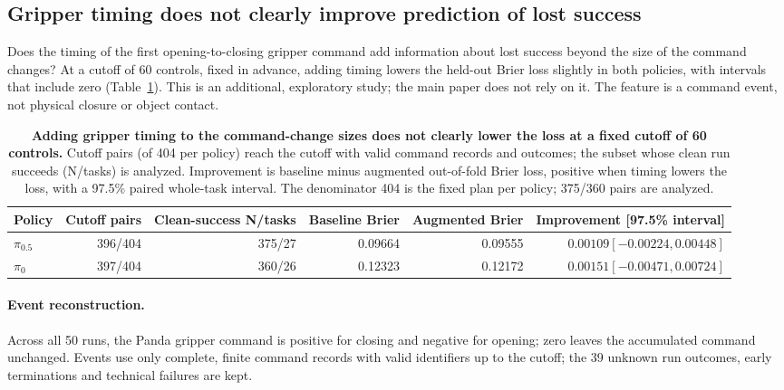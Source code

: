 \subsection{Gripper timing does not clearly improve prediction of lost success}
\label{sec:supp-landmark-final}
Does the timing of the first opening-to-closing gripper command add information about lost success beyond the size of the command changes? At a cutoff of 60 controls, fixed in advance, adding timing lowers the held-out Brier loss slightly in both policies, with intervals that include zero (Table~\ref{tab:landmark-final}). This is an additional, exploratory study; the main paper does not rely on it. The feature is a command event, not physical closure or object contact.

\begin{table}[t]
\caption{\textbf{Adding gripper timing to the command-change sizes does not clearly lower the loss at a fixed cutoff of 60 controls.} Cutoff pairs (of 404 per policy) reach the cutoff with valid command records and outcomes; the subset whose clean run succeeds (N/tasks) is analyzed. Improvement is baseline minus augmented out-of-fold Brier loss, positive when timing lowers the loss, with a 97.5\% paired whole-task interval. The denominator 404 is the fixed plan per policy; 375/360 pairs are analyzed.}

\centering\small
\begin{tabular}{lrrrrr}\toprule
Policy & Cutoff pairs & Clean-success N/tasks & Baseline Brier & Augmented Brier & Improvement [97.5\% interval]\\\midrule
$\pi_{0.5}$ & 396/404 & 375/27 & 0.09664 & 0.09555 & $0.00109[-0.00224,0.00448]$\\
$\pi_0$ & 397/404 & 360/26 & 0.12323 & 0.12172 & $0.00151[-0.00471,0.00724]$\\\bottomrule
\end{tabular}

\label{tab:landmark-final}
\end{table}

\paragraph{Event reconstruction.}
Across all 50 runs, the Panda gripper command is positive for closing and negative for opening; zero leaves the accumulated command unchanged. Events use only complete, finite command records with valid identifiers up to the cutoff; the 39 unknown run outcomes, early terminations and technical failures are kept.

